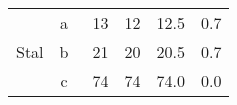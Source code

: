 \begin{table}[H]
{\begin{tabular}{|c|c|r|r|r|r|}
    \multirow{3}{*}{Stal}                                                                            & a~       & 13                                 & 12                                 & 12.5                                  & 0.7                                      \\ \cline{2-6} 
                                                                                                     & b~       & 21                                 & 20                                 & 20.5                                  & 0.7                                      \\ \cline{2-6} 
                                                                                                     & c~       & 74                                 & 74                                 & 74.0                                  & 0.0                                      \\ \hline
    \end{tabular}%
    }
    \end{table}